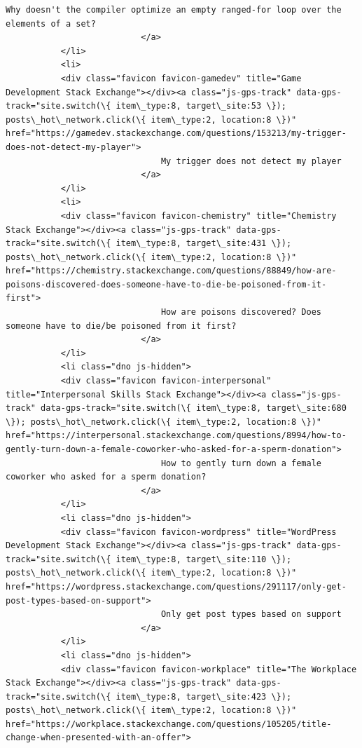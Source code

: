 \documentclass[11pt]{article}
\begin{document}
\begin{Verbatim}[commandchars=\\\{\}]
                               Why doesn't the compiler optimize an empty ranged-for loop over the elements of a set?
                           </a>
           </li>
           <li>
           <div class="favicon favicon-gamedev" title="Game Development Stack Exchange"></div><a class="js-gps-track" data-gps-track="site.switch(\{ item\_type:8, target\_site:53 \}); posts\_hot\_network.click(\{ item\_type:2, location:8 \})" href="https://gamedev.stackexchange.com/questions/153213/my-trigger-does-not-detect-my-player">
                               My trigger does not detect my player
                           </a>
           </li>
           <li>
           <div class="favicon favicon-chemistry" title="Chemistry Stack Exchange"></div><a class="js-gps-track" data-gps-track="site.switch(\{ item\_type:8, target\_site:431 \}); posts\_hot\_network.click(\{ item\_type:2, location:8 \})" href="https://chemistry.stackexchange.com/questions/88849/how-are-poisons-discovered-does-someone-have-to-die-be-poisoned-from-it-first">
                               How are poisons discovered? Does someone have to die/be poisoned from it first?
                           </a>
           </li>
           <li class="dno js-hidden">
           <div class="favicon favicon-interpersonal" title="Interpersonal Skills Stack Exchange"></div><a class="js-gps-track" data-gps-track="site.switch(\{ item\_type:8, target\_site:680 \}); posts\_hot\_network.click(\{ item\_type:2, location:8 \})" href="https://interpersonal.stackexchange.com/questions/8994/how-to-gently-turn-down-a-female-coworker-who-asked-for-a-sperm-donation">
                               How to gently turn down a female coworker who asked for a sperm donation?
                           </a>
           </li>
           <li class="dno js-hidden">
           <div class="favicon favicon-wordpress" title="WordPress Development Stack Exchange"></div><a class="js-gps-track" data-gps-track="site.switch(\{ item\_type:8, target\_site:110 \}); posts\_hot\_network.click(\{ item\_type:2, location:8 \})" href="https://wordpress.stackexchange.com/questions/291117/only-get-post-types-based-on-support">
                               Only get post types based on support
                           </a>
           </li>
           <li class="dno js-hidden">
           <div class="favicon favicon-workplace" title="The Workplace Stack Exchange"></div><a class="js-gps-track" data-gps-track="site.switch(\{ item\_type:8, target\_site:423 \}); posts\_hot\_network.click(\{ item\_type:2, location:8 \})" href="https://workplace.stackexchange.com/questions/105205/title-change-when-presented-with-an-offer">

\end{Verbatim}
\end{document}
